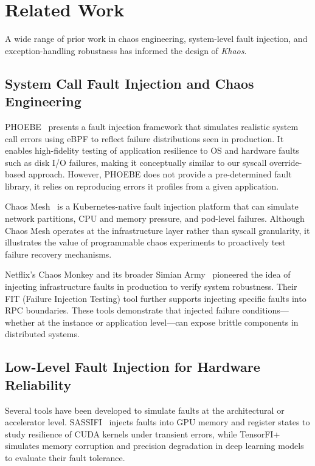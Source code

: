 \section{Related Work}
\label{sec:related_work}

A wide range of prior work in chaos engineering, system-level fault injection, and exception-handling robustness has informed the design of \textit{Khaos}.

\subsection{System Call Fault Injection and Chaos Engineering}

PHOEBE~\cite{Zhang2020phoebe} presents a fault injection framework that simulates realistic system call errors using eBPF to reflect failure distributions seen in production. It enables high-fidelity testing of application resilience to OS and hardware faults such as disk I/O failures, making it conceptually similar to our syscall override-based approach. However, PHOEBE does not provide a pre-determined fault library, it relies on reproducing errors it profiles from a given application.

Chaos Mesh~\cite{chaosmesh2023} is a Kubernetes-native fault injection platform that can simulate network partitions, CPU and memory pressure, and pod-level failures. Although Chaos Mesh operates at the infrastructure layer rather than syscall granularity, it illustrates the value of programmable chaos experiments to proactively test failure recovery mechanisms.

Netflix's Chaos Monkey and its broader Simian Army~\cite{netflixchaosmonkey} pioneered the idea of injecting infrastructure faults in production to verify system robustness. Their FIT (Failure Injection Testing) tool further supports injecting specific faults into RPC boundaries. These tools demonstrate that injected failure conditions—whether at the instance or application level—can expose brittle components in distributed systems.

\subsection{Low-Level Fault Injection for Hardware Reliability}

Several tools have been developed to simulate faults at the architectural or accelerator level. SASSIFI~\cite{sassifi2017} injects faults into GPU memory and register states to study resilience of CUDA kernels under transient errors, while TensorFI+~\cite{tensorfi2022} simulates memory corruption and precision degradation in deep learning models to evaluate their fault tolerance.


